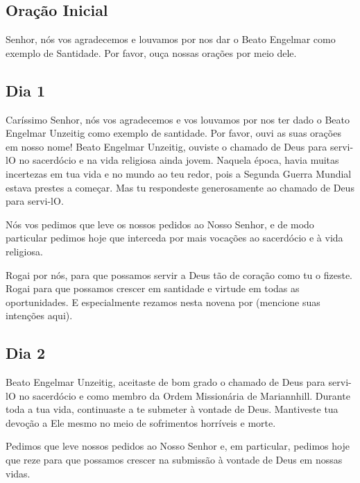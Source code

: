 \documentclass[a4paper,14pt]{extarticle} \usepackage[utf8]{inputenc}
\begin{document}
\subsection{Oração Inicial}\label{sub:inicial} %

Senhor, nós vos agradecemos e louvamos por nos dar o Beato Engelmar como exemplo de Santidade. Por favor, ouça nossas orações por meio dele.

\subsection{Dia 1}

\underline{}

Caríssimo Senhor, nós vos agradecemos e vos louvamos por nos ter dado o Beato Engelmar Unzeitig como exemplo de santidade. Por favor, ouvi as suas orações em nosso nome! Beato Engelmar Unzeitig, ouviste o chamado de Deus para servi-lO no sacerdócio e na vida religiosa ainda jovem. Naquela época, havia muitas incertezas em tua vida e no mundo ao teu redor, pois a Segunda Guerra Mundial estava prestes a começar. Mas tu respondeste generosamente ao chamado de Deus para servi-lO.

Nós vos pedimos que leve os nossos pedidos ao Nosso Senhor, e de modo particular pedimos hoje que interceda por mais vocações ao sacerdócio e à vida religiosa. 

Rogai por nós, para que possamos servir a Deus tão de coração como tu o fizeste. Rogai para que possamos crescer em santidade e virtude em todas as oportunidades. E especialmente rezamos nesta novena por (mencione suas intenções aqui).

\underline{}

\subsection{Dia 2}

\underline{}

Beato Engelmar Unzeitig, aceitaste de bom grado o chamado de Deus para servi-lO no sacerdócio e como membro da Ordem Missionária de Mariannhill. Durante toda a tua vida, continuaste a te submeter à vontade de Deus. Mantiveste tua devoção a Ele mesmo no meio de sofrimentos horríveis e morte.

Pedimos que leve nossos pedidos ao Nosso Senhor e, em particular, pedimos hoje que reze para que possamos crescer na submissão à vontade de Deus em nossas vidas. 
\end{document}
